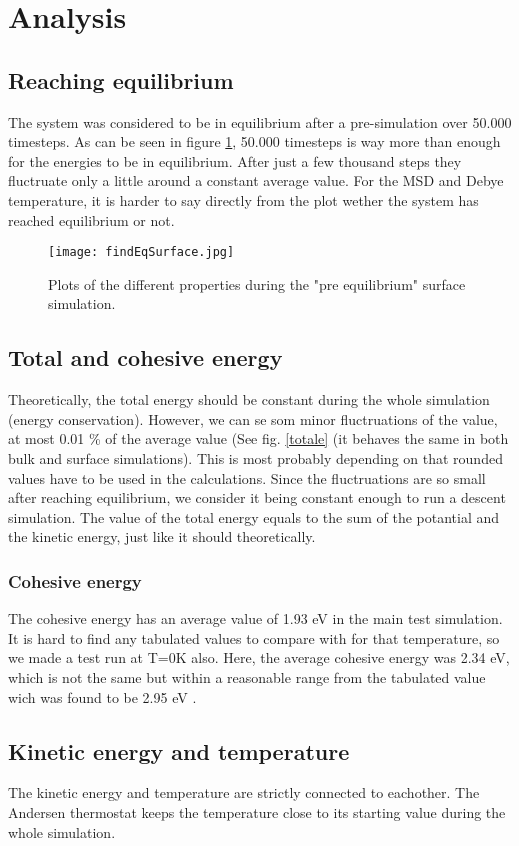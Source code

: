 \section{Analysis}

\subsection{Reaching equilibrium}
The system was considered to be in equilibrium after a pre-simulation over 50.000 timesteps. As can be seen in figure \ref{findeq}, 50.000 timesteps is way more than enough for the energies to be in equilibrium. After just a few thousand steps they fluctruate only a little around a constant average value. For the MSD and Debye temperature, it is harder to say directly from the plot wether the system has reached equilibrium or not.
\begin{figure}[H]
	\centering
	\texttt{[image: findEqSurface.jpg]}
	\caption{Plots of the different properties during the "pre equilibrium" surface simulation.}
	\label{findeq}
\end{figure}
\subsection{Total and cohesive energy}
Theoretically, the total energy should be constant during the whole simulation (energy conservation). However, we can se som minor fluctruations of the value, at most 0.01 \% of the average value (See fig. \ref{totale} (it behaves the same in both bulk and surface simulations). This is most probably depending on that rounded values have to be used in the calculations. Since the fluctruations are so small after reaching equilibrium, we consider it being constant enough to run a descent simulation. 
The value of the total energy equals to the sum of the potantial and the kinetic energy, just like it should theoretically.
\subsubsection{Cohesive energy}
The cohesive energy has an average value of 1.93 eV in the main test simulation. It is hard to find any tabulated values to compare with for that temperature, so we made a test run at T=0K also. Here, the average cohesive energy was 2.34 eV, which is not the same but within a reasonable range from the tabulated value wich was found to be 2.95 eV \cite{kittel}.

\subsection{Kinetic energy and temperature}
The kinetic energy and temperature are strictly connected to eachother. The Andersen thermostat keeps the temperature close to its starting value during the whole simulation.

